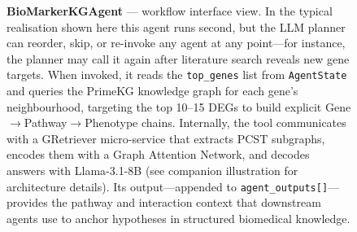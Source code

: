 \begin{figure}[htbp]
{%
}%
\caption{\textbf{BioMarkerKGAgent} --- workflow interface view.
In the typical realisation shown here this agent runs second, but
the LLM planner can reorder, skip, or re-invoke any agent at any
point---for instance, the planner may call it again after literature
search reveals new gene targets.  When invoked, it reads the
\texttt{top\_genes} list from \texttt{AgentState} and queries the
PrimeKG knowledge graph for each gene's neighbourhood, targeting the
top 10--15 DEGs to build explicit
Gene$\rightarrow$Pathway$\rightarrow$Phenotype chains.  Internally,
the tool communicates with a GRetriever micro-service that extracts
PCST subgraphs, encodes them with a Graph Attention Network, and
decodes answers with Llama-3.1-8B (see companion illustration for
architecture details).  Its output---appended to
\texttt{agent\_outputs[]}---provides the pathway and interaction
context that downstream agents use to anchor hypotheses in structured
biomedical knowledge.}
\label{fig:closeup-biomarkerkg}
\end{figure}
